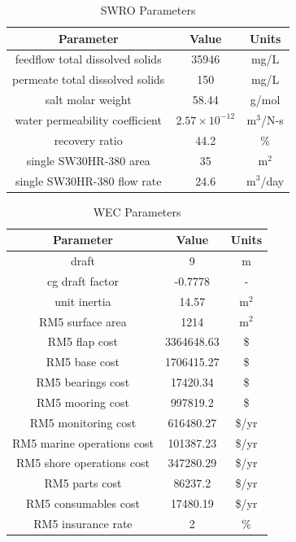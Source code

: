 \documentclass[a4paper,12pt]{elsarticle}
\begin{document}
\begin{table}[h]
    \centering
    \caption{SWRO Parameters}
    \begin{tabular}{ccc}
        \hline
        \textbf{Parameter} & \textbf{Value} & \textbf{Units} \\
        \hline
        feedflow total dissolved solids & 35946 \cite{Yu2018} & mg/L \\
        permeate total dissolved solids & 150 \cite{Yu2018} & mg/L \\
        salt molar weight & 58.44 & g/mol \\
        water permeability coefficient & $2.57\times10^{-12}$ \cite{Yu2018} & m$^3$/N-s \\
        recovery ratio & 44.2 \cite{wave} & \% \\
        single SW30HR-380 area & 35 \cite{SW30HR380} & m$^2$ \\
        single SW30HR-380 flow rate & 24.6 \cite{SW30HR380} & m$^3$/day \\
        \hline
    \end{tabular}
    \label{tab:paramsswro}
\end{table}

\begin{table}[h]
    \centering
    \caption{WEC Parameters}
    \begin{tabular}{ccc}
        \hline
        \textbf{Parameter} & \textbf{Value} & \textbf{Units} \\
        \hline
        draft & 9 & m \\
        cg draft factor & -0.7778 & - \\
        unit inertia & 14.57 & m$^2$ \\
        RM5 surface area & 1214 \cite{rm5} & m$^2$ \\
        RM5 flap cost & 3364648.63 \cite{rm5} & \$ \\
        RM5 base cost & 1706415.27 \cite{rm5} & \$ \\
        RM5 bearings cost & 17420.34 \cite{rm5} & \$ \\
        RM5 mooring cost & 997819.2 \cite{rm5} & \$ \\
        RM5 monitoring cost & 616480.27 \cite{rm5} & \$/yr \\
        RM5 marine operations cost & 101387.23 \cite{rm5} & \$/yr \\
        RM5 shore operations cost & 347280.29 \cite{rm5} & \$/yr \\
        RM5 parts cost & 86237.2 \cite{rm5} & \$/yr \\
        RM5 consumables cost & 17480.19 \cite{rm5} & \$/yr \\
        RM5 insurance rate & 2 \cite{rm5} & \% \\
        \hline
    \end{tabular}
    \label{tab:paramswec}
\end{table}
\end{document}
